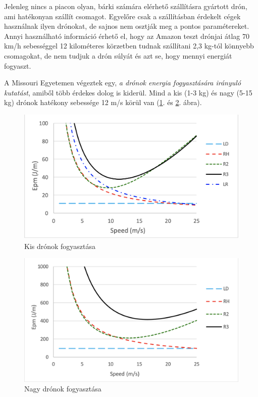 Jelenleg nincs a piacon olyan, bárki számára elérhető szállításra gyártott drón, ami hatékonyan szállít csomagot.
Egyelőre csak a szállításban érdekelt cégek használnak ilyen drónokat, de sajnos nem osztják meg a pontos paramétereket.
Annyi használható információ érhető el, hogy az Amazon teszt drónjai átlag 70 km/h sebességgel 12 kilométeres körzetben tudnak szállítani 2,3 kg-tól könnyebb csomagokat, de nem tudjuk a drón súlyát és azt se, hogy mennyi energiát fogyaszt.

A Missouri Egyetemen végeztek egy, \textit{a drónok energia fogyasztására irányuló kutatást}\cite{dron-szallitas-kutatas},
amiből több érdekes dolog is kiderül. Mind a kis (1-3 kg) és nagy (5-15 kg) drónok hatékony sebessége  12 m/s körül van (\ref{fig:kis}. és \ref{fig:nagy}. ábra).

\begin{figure}[h]
    \centering
    \includegraphics[scale=0.4]{images/fogyasztas-kis-dronok.png}
    \caption{Kis drónok fogyasztása}
    \label{fig:kis}
\end{figure}


\begin{figure}[h]
    \centering
    \includegraphics[scale=0.4]{images/fogyasztas-nagy-dronok.png}
    \caption{Nagy drónok fogyasztása}
    \label{fig:nagy}
\end{figure}

